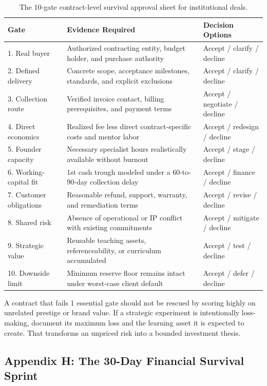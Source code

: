 \begin{table}[htbp]
\centering
\small
\begin{tabularx}{\textwidth}{lp{7.0cm}X}
\toprule
\textbf{Gate} & \textbf{Evidence Required} & \textbf{Decision Options} \\
\midrule
1. Real buyer & Authorized contracting entity, budget holder, and purchase authority & Accept / clarify / decline \\
2. Defined delivery & Concrete scope, acceptance milestones, standards, and explicit exclusions & Accept / clarify / decline \\
3. Collection route & Verified invoice contact, billing prerequisites, and payment terms & Accept / negotiate / decline \\
4. Direct economics & Realized fee less direct contract-specific costs and mentor labor & Accept / redesign / decline \\
5. Founder capacity & Necessary specialist hours realistically available without burnout & Accept / stage / decline \\
6. Working-capital fit & 1st cash trough modeled under a 60-to-90-day collection delay & Accept / finance / decline \\
7. Customer obligations & Reasonable refund, support, warranty, and remediation terms & Accept / revise / decline \\
8. Shared risk & Absence of operational or IP conflict with existing commitments & Accept / mitigate / decline \\
9. Strategic value & Reusable teaching assets, referenceability, or curriculum accumulated & Accept / test / decline \\
10. Downside limit & Minimum reserve floor remains intact under worst-case client default & Accept / defer / decline \\
\bottomrule
\end{tabularx}
\caption{The 10-gate contract-level survival approval sheet for institutional deals.}
\end{table}

A contract that fails 1 essential gate should not be rescued by scoring highly on unrelated prestige or brand value. If a strategic experiment is intentionally loss-making, document its maximum loss and the learning asset it is expected to create. That transforms an unpriced risk into a bounded investment thesis.

\subsection*{Appendix H: The 30-Day Financial Survival Sprint}

